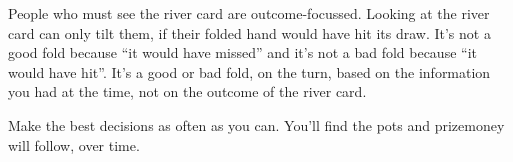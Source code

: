 People who must see the river card are outcome-focussed. Looking
at the river card can only tilt them, if their folded hand would
have hit its draw. It's not a good fold because ``it would have
missed'' and it's not a bad fold because ``it would have hit''. It's
a good or bad fold, on the turn, based on the information you
had at the time, not on the outcome of the river card.


Make the best decisions as often as you can. You'll find the pots
and prizemoney will follow, over time.
